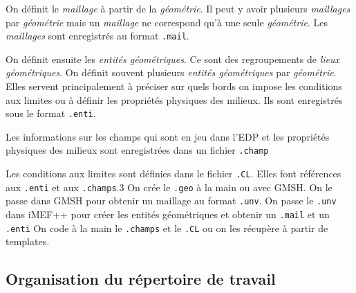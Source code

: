 \documentclass[a4paper,12pt]{article}
\begin{document}
On définit le \emph{maillage} à partir de la \emph{géométrie}. Il peut y avoir plusieurs \emph{maillages} par \emph{géométrie} mais un \emph{maillage} ne correspond qu'à une seule \emph{géométrie}. 
Les \emph{maillages} sont enregistrés au format \texttt{.mail}.

On définit ensuite les \emph{entités géométriques}. Ce sont des regroupements de \emph{lieux géométriques}. 
On définit souvent plusieurs \emph{entités géométriques} par \emph{géométrie}. Elles servent principalement à préciser sur quels bords on impose les conditions aux limites 
ou à définir les propriétés physiques des milieux.
Ils sont enregistrés sous le format \texttt{.enti}.

Les informations sur les champs qui sont en jeu dans l'EDP et les propriétés physiques des milieux sont enregistrées dans un fichier \texttt{.champ}

Les conditions aux limites sont définies dans le fichier \texttt{.CL}. Elles font références aux \texttt{.enti} et aux \texttt{.champs}.3
\newline
\newline
On crée le \texttt{.geo} à la main ou avec GMSH. On le passe dans GMSH pour obtenir un maillage au format \texttt{.unv}. 
On passe le \texttt{.unv} dans iMEF++ pour créer les entités géométriques et obtenir un \texttt{.mail} et un \texttt{.enti}
On code à la main le \texttt{.champs} et le \texttt{.CL} ou on les récupère à partir de templates.
\subsection{Organisation du répertoire de travail}
\end{document}
